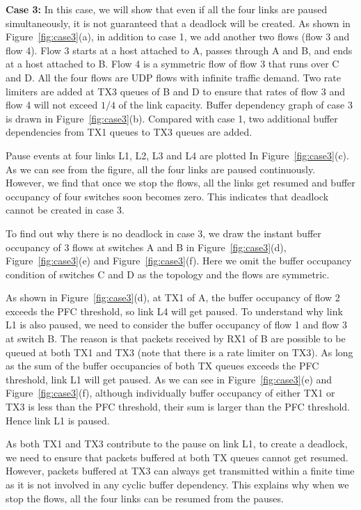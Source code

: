 \textbf{Case 3:} In this case, we will show that even if all the four links are paused simultaneously, 
it is not guaranteed that a deadlock will be created. As shown in Figure~\ref{fig:case3}(a), in addition 
to case 1, we add another two flows (flow 3 and flow 4). Flow 3 starts at a host attached to A, passes 
through A and B, and ends at a host attached to B. Flow 4 is a symmetric flow of flow 3 that runs over 
C and D. All the four flows are UDP flows with infinite traffic demand. Two rate limiters are added at 
TX3 queues of B and D to ensure that rates of flow 3 and flow 4 will not exceed $1/4$ of the link 
capacity. Buffer dependency graph of case 3 is drawn in Figure~\ref{fig:case3}(b). Compared with case 1, 
two additional buffer dependencies from TX1 queues to TX3 queues are added.

Pause events at four links L1, L2, L3 and L4 are plotted In Figure~\ref{fig:case3}(c).  As we can see 
from the figure, all the four links are paused continuously. However, we find that once we stop the 
flows, all the links get resumed and buffer occupancy of four switches soon becomes zero. This 
indicates that deadlock cannot be created in case 3.

To find out why there is no deadlock in case 3, we draw the instant buffer occupancy of 3 flows at 
switches A and B in Figure~\ref{fig:case3}(d), Figure~\ref{fig:case3}(e) and Figure~\ref{fig:case3}(f). 
Here we omit the buffer occupancy condition of switches C and D as the topology and the flows are symmetric.

As shown in Figure~\ref{fig:case3}(d), at TX1 of A, the buffer occupancy of flow 2 exceeds the PFC 
threshold, so link L4 will get paused. To understand why link L1 is also paused, we need to consider 
the buffer occupancy of flow 1 and flow 3 at switch B. The reason is that packets received by RX1 of 
B are possible to be queued at both TX1 and TX3 (note that there is a rate limiter on TX3). As long 
as the sum of the buffer occupancies of both TX queues exceeds the PFC threshold, link L1 will get paused. 
As we can see in Figure~\ref{fig:case3}(e) and Figure~\ref{fig:case3}(f), although individually buffer 
occupancy of either TX1 or TX3 is less than the PFC threshold, their sum is larger than the PFC 
threshold. Hence link L1 is paused.

As both TX1 and TX3 contribute to the pause on link L1, to create a deadlock, we need to ensure that 
packets buffered at both TX queues cannot get resumed. However, packets buffered at TX3 can always get 
transmitted within a finite time as it is not involved in any cyclic buffer dependency. This explains 
why when we stop the flows, all the four links can be resumed from the pauses. 
\fi


